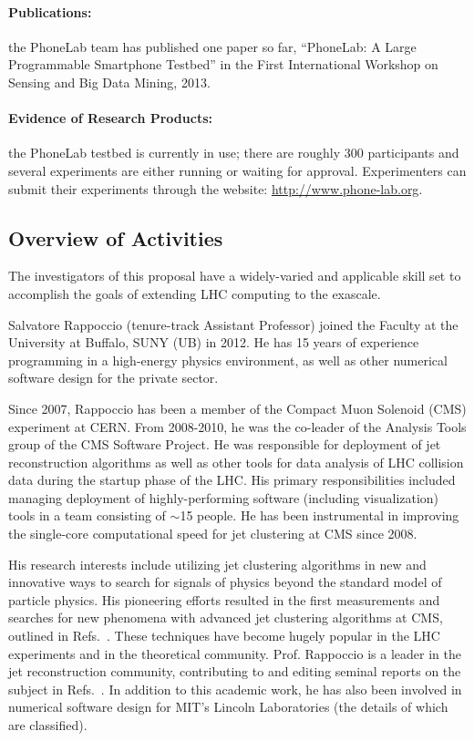 \documentclass[times,11pt]{article}
\begin{document}
\paragraph{Publications:} the PhoneLab team has published one paper so far,
``PhoneLab: A Large Programmable Smartphone Testbed'' in the First International
Workshop on Sensing and Big Data Mining, 2013.

\paragraph{Evidence of Research Products:} the PhoneLab testbed is currently in
use; there are roughly 300 participants and several experiments are either
running or waiting for approval. Experimenters can submit their experiments
through the website: \url{http://www.phone-lab.org}.

\subsection{Overview of Activities}

The investigators of this proposal have a
widely-varied and applicable skill set to accomplish the goals of
extending LHC computing to the exascale. 




Salvatore Rappoccio (tenure-track Assistant Professor) joined the
Faculty at the University at Buffalo, SUNY (UB) in 2012. He has 15
years of experience programming in a
high-energy physics environment, as well as other numerical software
design for the private sector.

Since 2007, Rappoccio has been a member of the Compact Muon Solenoid
(CMS) experiment at CERN. 
From 2008-2010, he was the co-leader of the Analysis Tools group of
the CMS Software Project. He was responsible for deployment of jet
reconstruction algorithms as well as other tools for data analysis of
LHC collision data during the startup phase of the LHC. His primary
responsibilities included managing deployment of highly-performing
software (including visualization) tools in a team consisting of
$\sim$15 people. He has been instrumental in improving the single-core
computational speed for jet clustering at CMS since 2008. 

His research interests include utilizing jet clustering algorithms in
new and innovative ways to search for signals of physics beyond the
standard model of particle physics. His pioneering efforts resulted in
the first measurements and searches for new phenomena with advanced jet clustering
algorithms at CMS, outlined in 
Refs.~\cite{EXO-11-006,EXO-11-095,SMP-12-019}. These
techniques have become hugely popular in the LHC experiments and in
the theoretical community. Prof. Rappoccio is a leader in the jet
reconstruction community, contributing to and editing seminal reports
on the subject in Refs.~\cite{boost2010,boost2011,boost2012}.
In addition to this academic work, he has also been involved in
numerical software design for MIT's Lincoln Laboratories (the details
of which are classified). 
\end{document}

